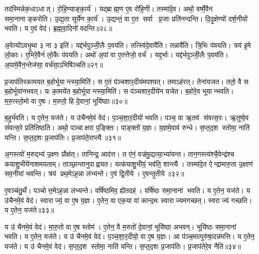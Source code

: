 तद॑स्मिन्नेक॒धाऽधात्। रो॒हि॒ण्याङ्का॒र्य॑। यद्ब्राह्म॒ण ए॒व रो॑हि॒णी। तस्मा॑दे॒व। अथो॒ वर्ष्मै॒वैन समा॒नानाङ्करोति। उ॒द्य॒ता सूर्ये॑ण का॒र्य॑। उ॒द्यन्तं॒ वा ए॒त सर्वा प्र॒जाः प्रति॑नन्दन्ति। दि॒दृ॒क्षेण्यो॑ दर्\mbox{}श॒नीयो॑ भवति। य ए॒वं वेद॑। ब्र॒ह्म॒वा॒दिनो॑ वदन्ति॥२८॥

अ॒वेत्यो॑ऽवभृ॒था ३ ना ३ इति॑। यद्द॑र्भपुञ्जी॒लैः प॒वय॑ति। तत्स्वि॑दे॒वावै॑ति। तन्नावै॑ति। त्रि॒भिः प॑वयति। त्रय॑ इ॒मे लो॒काः। ए॒भिरे॒वैनं॑ लो॒कैः प॑वयति। अथो॑ अ॒पां वा ए॒तत्तेजो॒ वर्च॑। यद्द॒र्भाः। यद्द॑र्भपुञ्जी॒लैः प॒वय॑ति। अ॒पामे॒वैन॒न्तेज॑सा॒ वर्च॑सा॒ऽभिषि॑ञ्चति॥२९॥\anuvakamend[भ॒व॒न्त्यष्ट्रा॑मव॒रुध्य॑ वदन्ति द॒र्भा यद्द॑र्भपुञ्जी॒लैः प॒वय॒त्येकं च]

प्र॒जाप॑तिरकामयत ब॒होर्भूयान्त्स्या॒मिति॑। स ए॒तं प॑ञ्चशार॒दीय॑मपश्यत्। तमाऽह॑रत्। तेना॑यजत। ततो॒ वै स ब॒होर्भूया॑नभवत्। यः का॒मये॑त ब॒होर्भूयान्त्स्या॒मिति॑। स प॑ञ्चशार॒दीये॑न यजेत। ब॒होरे॒व भूयान्भवति। म॒रु॒त्स्तो॒मो वा ए॒षः। म॒रुतो॒ हि दे॒वानां॒ भूयि॑ष्ठाः॥३०॥

ब॒हुर्भ॑वति। य ए॒तेन॒ यज॑ते। य उ॑चैनमे॒वं वेद॑। प॒ञ्च॒शा॒र॒दीयो॑ भवति। पञ्च॒ वा ऋ॒तव॑ संवत्स॒रः। ऋ॒तुष्वे॒व सं॑वत्स॒रे प्रति॑तिष्ठति। अथो॒ पञ्चाक्षरा प॒ङ्क्तिः। पाङ्क्तो॑ य॒ज्ञः। य॒ज्ञमे॒वाव॑ रुन्धे। स॒प्त॒द॒श स्तोमा॒ नाति॑ यन्ति। स॒प्त॒द॒शः प्र॒जाप॑तिः। प्र॒जाप॑ते॒राप्त्यै॥३१॥\anuvakamend[भूयि॑ष्ठा यन्ति॒ द्वे च॑]

अ॒गस्त्यो॑ म॒रुद्भ्य॑ उ॒क्ष्णः प्रौक्ष॑त्। तानिन्द्र॒ आद॑त्त। त ए॑नं॒ वज्र॑मु॒द्यत्या॒भ्या॑यन्त। तान॒गस्त्य॑श्चै॒वेन्द्र॑श्च कयाशु॒भीये॑नाशमयताम्। ताञ्छा॒न्तानुपाह्वयत। यत्क॑याशु॒भीयं॒ भव॑ति॒ शान्त्यै। तस्मा॑दे॒त ऐन्द्रामारु॒ता उ॒क्षाण॑ सव॒नीया॑ भवन्ति। त्रय॑ प्रथ॒मेऽह॒न्ना ल॑भ्यन्ते। ए॒वं द्वि॒तीये। ए॒वन्तृ॒तीये॥३२॥

ए॒वञ्च॑तु॒र्थे। पञ्चोत्त॒मेऽह॒न्ना ल॑भ्यन्ते। वर्\mbox{}षि॑ष्ठमिव॒ ह्ये॑तदह॑। वर्\mbox{}षि॑ष्ठः समा॒नानां भवति। य ए॒तेन॒ यज॑ते। य उ॑चैनमे॒वं वेद॑। स्वाराज्यं॒ वा ए॒ष य॒ज्ञः। ए॒तेन॒ वा एक॒या वा॑ कान्द॒मः स्वाराज्यमगच्छत्। स्वराज्यं गच्छति। य ए॒तेन॒ यज॑ते॥३३॥

य उ॑ चैनमे॒वं वेद॑। मा॒रु॒तो वा ए॒ष स्तोम॑। ए॒तेन॒ वै म॒रुतो॑ दे॒वानां॒ भूयि॑ष्ठा अभवन्। भूयि॑ष्ठः समा॒नानां भवति। य ए॒तेन॒ यज॑ते। य उ॑ चैनमे॒वं वेद॑। प॒ञ्च॒शा॒र॒दीयो॒ वा ए॒ष य॒ज्ञः। आ प॑ञ्च॒मात्पुरु॑षा॒दन्न॑मत्ति। य ए॒तेन॒ यज॑ते। य उ॑ चैनमे॒वं वेद॑। स॒प्त॒द॒श स्तोमा॒ नाति॑ यन्ति। स॒प्त॒द॒शः प्र॒जाप॑तिः। प्र॒जाप॑तेरे॒व नैति॑॥३४॥\anuvakamend[तृ॒तीये॑ गच्छति॒ य ए॒तेन॒ यज॑तेऽत्ति॒ य ए॒तेन॒ यज॑ते॒ य उ॑ चैनमे॒वं वेद॒ त्रीणि॑ च (अ॒गस्त्य॒ स्वाराज्यं मारु॒तः प॑ञ्चशार॒दीयो॒ वा ए॒ष य॒ज्ञः स॑प्तद॒शं प्र॒जाप॑तेरे॒व नैति॑ ॥ )]

